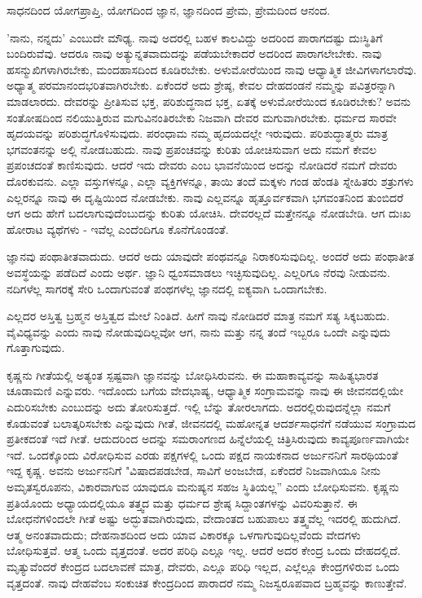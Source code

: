 ಸಾಧನದಿಂದ ಯೋಗಪ್ರಾಪ್ತಿ, ಯೋಗದಿಂದ ಜ್ಞಾನ, ಜ್ಞಾನದಿಂದ ಪ್ರೇಮ, ಪ್ರೇಮದಿಂದ ಆನಂದ.

'ನಾನು, ನನ್ನದು' ಎಂಬುದೇ ಮೌಢ್ಯ. ನಾವು ಅದರಲ್ಲಿ ಬಹಳ ಕಾಲವಿದ್ದು ಅದರಿಂದ ಪಾರಾಗದಷ್ಟು ದುಃಸ್ಥಿತಿಗೆ ಬಂದಿರುವೆವು. ಆದರೂ ನಾವು ಅತ್ಯುನ್ನತವಾದುದನ್ನು ಪಡೆಯಬೇಕಾದರೆ ಅದರಿಂದ ಪಾರಾಗಲೇಬೇಕು. ನಾವು ಹಸನ್ಮುಖಿಗಳಾಗಿರಬೇಕು, ಮಂದಹಾಸದಿಂದ ಕೂಡಿರಬೇಕು. ಅಳುಮೋರೆಯಿಂದ ನಾವು ಆಧ್ಯಾತ್ಮಿಕ ಜೀವಿಗಳಾಗಲಾರೆವು. ಅಧ್ಯಾತ್ಮ ಪರಮಾನಂದಭರಿತವಾಗಿರಬೇಕು. ಏಕೆಂದರೆ ಅದು ಶ್ರೇಷ್ಠ, ಕೇವಲ ದೇಹದಂಡನೆ ನಮ್ಮನ್ನು ಪವಿತ್ರರನ್ನಾಗಿ ಮಾಡಲಾರದು. ದೇವರನ್ನು ಪ್ರೀತಿಸುವ ಭಕ್ತ, ಪರಿಶುದ್ಧನಾದ ಭಕ್ತ, ಏತಕ್ಕೆ ಅಳುಮೋರೆಯಿಂದ ಕೂಡಿರಬೇಕು? ಅವನು ಸಂತೋಷದಿಂದ ನಲಿಯುತ್ತಿರುವ ಮಗುವಿನಂತಿರಬೇಕು ನಿಜವಾಗಿ ದೇವರ ಮಗುವಾಗಿರಬೇಕು. ಧರ್ಮದ ಸಾರವೇ ಹೃದಯವನ್ನು ಪರಿಶುದ್ಧಗೊಳಿಸುವುದು. ಪರಂಧಾಮ ನಮ್ಮ ಹೃದಯದಲ್ಲೇ ಇರುವುದು. ಪರಿಶುದ್ಧಾತ್ಮರು ಮಾತ್ರ ಭಗವಂತನನ್ನು ಅಲ್ಲಿ ನೋಡಬಹುದು. ನಾವು ಪ್ರಪಂಚವನ್ನು ಕುರಿತು ಯೋಚಿಸುವಾಗ ಅದು ನಮಗೆ ಕೇವಲ ಪ್ರಪಂಚದಂತೆ ಕಾಣಿಸುವುದು. ಆದರೆ ಇದು ದೇವರು ಎಂಬ ಭಾವನೆಯಿಂದ ಅದನ್ನು ನೋಡಿದರೆ ನಮಗೆ ದೇವರು ದೊರಕುವನು. ಎಲ್ಲಾ ವಸ್ತುಗಳನ್ನೂ, ಎಲ್ಲಾ ವ್ಯಕ್ತಿಗಳನ್ನೂ, ತಾಯಿ ತಂದೆ ಮಕ್ಕಳು ಗಂಡ ಹೆಂಡತಿ ಸ್ನೇಹಿತರು ಶತ್ರುಗಳು ಎಲ್ಲರನ್ನೂ ನಾವು ಈ ದೃಷ್ಟಿಯಿಂದ ನೋಡಬೇಕು. ನಾವು ಎಲ್ಲವನ್ನೂ ಹೃತ್ತೂರ್ವಕವಾಗಿ ಭಗವಂತನಿಂದ ತುಂಬಿದರೆ ಆಗ ಅದು ಹೇಗೆ ಬದಲಾಗುವುದೆಂಬುದನ್ನು ಕುರಿತು ಯೋಚಿಸಿ. ದೇವರಲ್ಲದೆ ಮತ್ತೇನನ್ನೂ ನೋಡಬೇಡಿ. ಆಗ ದುಃಖ ಹೋರಾಟ ವ್ಯಥೆಗಳು - ಇವೆಲ್ಲ ಎಂದೆಂದಿಗೂ ಕೊನೆಗೊಂಡಂತೆ.

ಜ್ಞಾನವು ಪಂಥಾತೀತವಾದುದು. ಆದರೆ ಅದು ಯಾವುದೇ ಪಂಥವನ್ನೂ ನಿರಾಕರಿಸುವುದಿಲ್ಲ. ಅಂದರೆ ಅದು ಪಂಥಾತೀತ ಅವಸ್ಥೆಯನ್ನು ಪಡೆದಿದೆ ಎಂದು ಅರ್ಥ. ಜ್ಞಾನಿ ಧ್ವಂಸಮಾಡಲು ಇಚ್ಛಿಸುವುದಿಲ್ಲ. ಎಲ್ಲರಿಗೂ ನೆರವು ನೀಡುವನು. ನದಿಗಳೆಲ್ಲ ಸಾಗರಕ್ಕೆ ಸೇರಿ ಒಂದಾಗುವಂತೆ ಪಂಥಗಳೆಲ್ಲ ಜ್ಞಾನದಲ್ಲಿ ಐಕ್ಯವಾಗಿ ಒಂದಾಗಬೇಕು.

ಎಲ್ಲದರ ಅಸ್ತಿತ್ವ ಬ್ರಹ್ಮನ ಅಸ್ತಿತ್ವದ ಮೇಲೆ ನಿಂತಿದೆ. ಹೀಗೆ ನಾವು ನೋಡಿದರೆ ಮಾತ್ರ ನಮಗೆ ಸತ್ಯ ಸಿಕ್ಕಬಹುದು. ವೈವಿಧ್ಯವನ್ನು ಎಂದು ನಾವು ನೋಡುವುದಿಲ್ಲವೋ ಆಗ, ನಾನು ಮತ್ತು ನನ್ನ ತಂದೆ ಇಬ್ಬರೂ ಒಂದೇ ಎನ್ನುವುದು ಗೊತ್ತಾಗುವುದು.

ಕೃಷ್ಣನು ಗೀತೆಯಲ್ಲಿ ಅತ್ಯಂತ ಸ್ಪಷ್ಟವಾಗಿ ಜ್ಞಾನವನ್ನು ಬೋಧಿಸಿರುವನು. ಈ ಮಹಾಕಾವ್ಯವನ್ನು ಸಾಹಿತ್ಯಭಾರತ ಚೂಡಾಮಣಿ ಎನ್ನುವರು. ಇದೊಂದು ಬಗೆಯ ವೇದಭಾಷ್ಯ, ಆಧ್ಯಾತ್ಮಿಕ ಸಂಗ್ರಾಮವನ್ನು ನಾವು ಈ ಜೀವನದಲ್ಲಿಯೇ ಎದುರಿಸಬೇಕು ಎಂಬುದನ್ನು ಅದು ತೋರಿಸುತ್ತದೆ. ಇಲ್ಲಿ ಬೆನ್ನು ತೋರಲಾಗದು. ಅದರಲ್ಲಿರುವುದನ್ನೆಲ್ಲಾ ನಮಗೆ ಕೊಡುವಂತೆ ಬಲಾತ್ಕರಿಸಬೇಕು ಎನ್ನುವುದು ಗೀತೆ, ಜೀವನದಲ್ಲಿ ಮಹೋನ್ನತ ಆದರ್ಶಸಾಧನೆಗೆ ನಡೆಯುವ ಸಂಗ್ರಾಮದ ಪ್ರತೀಕದಂತೆ ಇದೆ ಗೀತೆ. ಆದುದರಿಂದ ಅದನ್ನು ಸಮರಾಂಗಣದ ಹಿನ್ನೆಲೆಯಲ್ಲಿ ಚಿತ್ರಿಸಿರುವುದು ಕಾವ್ಯಪೂರ್ಣವಾಗಿಯೇ ಇದೆ. ಒಂದಕ್ಕೊಂದು ವಿರೋಧಿಸುವ ಎರಡು ಪಕ್ಷಗಳಲ್ಲಿ ಒಂದು ಪಕ್ಷದ ನಾಯಕನಾದ ಅರ್ಜುನನಿಗೆ ಸಾರಥಿಯಂತೆ ಇದ್ದ ಕೃಷ್ಣ. ಅವನು ಅರ್ಜುನನಿಗೆ "ವಿಷಾದಪಡಬೇಡ, ಸಾವಿಗೆ ಅಂಜಬೇಡ, ಏಕೆಂದರೆ ನಿಜವಾಗಿಯೂ ನೀನು ಅಮೃತಸ್ವರೂಪನು, ವಿಕಾರವಾಗುವ ಯಾವುದೂ ಮನುಷ್ಯನ ಸಹಜ ಸ್ಥಿತಿಯಲ್ಲ'' ಎಂದು ಬೋಧಿಸುವನು. ಕೃಷ್ಣನು ಪ್ರತಿಯೊಂದು ಅಧ್ಯಾಯದಲ್ಲಿಯೂ ತತ್ತ್ವದ ಮತ್ತು ಧರ್ಮದ ಶ್ರೇಷ್ಠ ಸಿದ್ದಾಂತಗಳನ್ನು ವಿವರಿಸುತ್ತಾನೆ. ಈ ಬೋಧನೆಗಳಿಂದಲೇ ಗೀತೆ ಅಷ್ಟು ಅದ್ಭುತವಾಗಿರುವುದು, ವೇದಾಂತದ ಬಹುಪಾಲು ತತ್ತ್ವವೆಲ್ಲ ಇದರಲ್ಲಿ ಹುದುಗಿದೆ. ಆತ್ಮ ಅನಂತವಾದುದು; ದೇಹನಾಶದಿಂದ ಅದು ಯಾವ ವಿಕಾರಕ್ಕೂ ಒಳಗಾಗುವುದಿಲ್ಲವೆಂದು ವೇದಗಳು ಬೋಧಿಸುತ್ತವೆ. ಆತ್ಮ ಒಂದು ವೃತ್ತದಂತೆ. ಅದರ ಪರಿಧಿ ಎಲ್ಲೂ ಇಲ್ಲ. ಆದರೆ ಅದರ ಕೇಂದ್ರ ಒಂದು ದೇಹದಲ್ಲಿದೆ. ಮೃತ್ಯುವೆಂದರೆ ಕೇಂದ್ರದ ಬದಲಾವಣೆ ಮಾತ್ರ, ದೇವರು, ಎಲ್ಲೂ ಪರಿಧಿ ಇಲ್ಲದ, ಎಲ್ಲೆಲ್ಲೂ ಕೇಂದ್ರಗಳಿರುವ ಒಂದು ವೃತ್ತದಂತೆ. ನಾವು ದೇಹವೆಂಬ ಸಂಕುಚಿತ ಕೇಂದ್ರದಿಂದ ಪಾರಾದರೆ ನಮ್ಮ ನಿಜಸ್ವರೂಪವಾದ ಬ್ರಹ್ಮವನ್ನು ಕಾಣುತ್ತೇವೆ.

